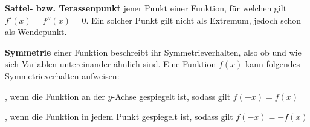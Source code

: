 \begin{figure}[h!]
\centering
\end{figure}

\textbf{Sattel- bzw. Terassenpunkt}  jener Punkt einer Funktion, f\"{u}r welchen gilt $f'(x) = f''(x) = 0$. Ein solcher Punkt gilt nicht als Extremum, jedoch schon als Wendepunkt.

\pagebreak

\textbf{Symmetrie}  einer Funktion beschreibt ihr Symmetrieverhalten, also ob und wie sich Variablen untereinander \"{a}hnlich sind. Eine Funktion $f(x)$ kann folgendes Symmetrieverhalten aufweisen:

\begin{itemize}
	, wenn die Funktion an der $y$-Achse gespiegelt ist, sodass gilt $f(-x) = f(x)$

	, wenn die Funktion in jedem Punkt gespiegelt ist, sodass gilt $f(-x) = -f(x)$
\end{itemize}

